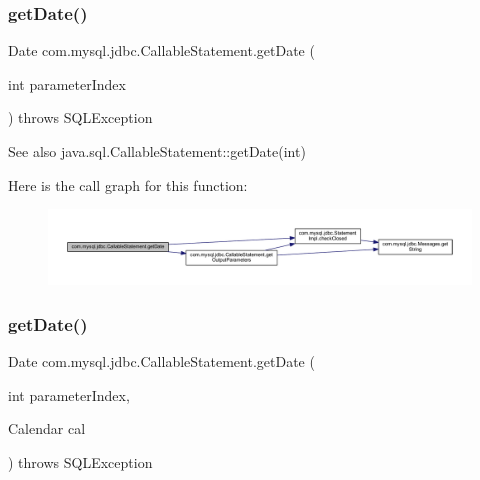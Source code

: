 \subsubsection{\texorpdfstring{get\+Date()}{getDate()}\hspace{0.1cm}{\footnotesize\ttfamily [1/4]}}
{\footnotesize\ttfamily Date com.\+mysql.\+jdbc.\+Callable\+Statement.\+get\+Date (\begin{DoxyParamCaption}\item[{int}]{parameter\+Index }\end{DoxyParamCaption}) throws S\+Q\+L\+Exception}

\begin{DoxySeeAlso}{See also}
java.\+sql.\+Callable\+Statement\+::get\+Date(int) 
\end{DoxySeeAlso}
Here is the call graph for this function\+:\nopagebreak
\begin{figure}[H]
\begin{center}
\leavevmode
\includegraphics[width=350pt]{classcom_1_1mysql_1_1jdbc_1_1_callable_statement_aa50f27f2049ef5a4d632bf90d49406c3_cgraph}
\end{center}
\end{figure}
\mbox{\label{classcom_1_1mysql_1_1jdbc_1_1_callable_statement_a8ab6fc7be6dedec149de4fa5062c88a3}} 
\subsubsection{\texorpdfstring{get\+Date()}{getDate()}\hspace{0.1cm}{\footnotesize\ttfamily [2/4]}}
{\footnotesize\ttfamily Date com.\+mysql.\+jdbc.\+Callable\+Statement.\+get\+Date (\begin{DoxyParamCaption}\item[{int}]{parameter\+Index,  }\item[{Calendar}]{cal }\end{DoxyParamCaption}) throws S\+Q\+L\+Exception}

